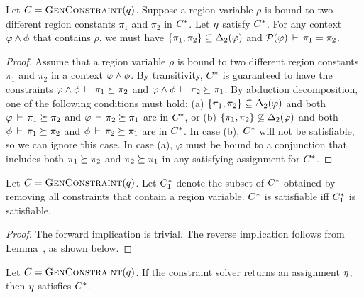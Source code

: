 \begin{lemma}
Let $C = \textsc{GenConstraint}(q)$.
Suppose a region variable $\rho$ is bound to two different region constants $\pi_1$
and $\pi_2$ in ${C}^*$.
Let $\eta$ satisfy ${C}^*$.
For any context $\varphi \wedge \phi$ that contains $\rho$, we must have
$\{ \pi_1, \pi_2 \} \subseteq {\Delta_2}(\varphi)$ and
$\mathcal{P}(\varphi)\,\vdash\,\pi_1 = \pi_2$.
\end{lemma}

\begin{proof}
  Assume that a region variable $\rho$ is bound to two different
  region constants $\pi_1$ and $\pi_2$ in a context $\varphi \wedge \phi$.
  By transitivity, ${C}^*$ is guaranteed to have the constraints
  $\varphi \wedge \phi\,\vdash\,\pi_1 \succeq \pi_2$
  and $\varphi \wedge \phi\,\vdash\,\pi_2 \succeq \pi_1$.
  By abduction decomposition, one of the following conditions must hold:
  (a) $\{ \pi_1, \pi_2 \} \subseteq {\Delta_2}(\varphi)$ and
  both $\varphi\,\vdash\,\pi_1 \succeq \pi_2$ and
  $\varphi\,\vdash\,\pi_2 \succeq \pi_1$ are in ${C}^*$, or
  (b) $\{ \pi_1, \pi_2 \} \not\subseteq {\Delta_2}(\varphi)$ and
  both $\phi\,\vdash\,\pi_1 \succeq \pi_2$ and
  $\phi\,\vdash\,\pi_2 \succeq \pi_1$ are in ${C}^*$.
  In case (b), ${C}^*$ will not be satisfiable, so we can ignore this case.
  In case (a), $\varphi$ must be bound to a conjunction that includes both
  $\pi_1 \succeq \pi_2$ and $\pi_2 \succeq \pi_1$ in any satisfying assignment
  for ${C}^*$.
\end{proof}

\begin{lemma}
Let $C = \textsc{GenConstraint}(q)$.
Let ${C}^*_1$ denote the subset of ${C}^*$ obtained by removing all constraints
that contain a region variable.
${C}^*$ is satisfiable iff ${C}^*_1$ is satisfiable.
\end{lemma}

\begin{proof}
  The forward implication is trivial.
  The reverse implication follows from Lemma~\label{lemma:completely-bound}, as shown below.


\end{proof}

\begin{theorem}
\label{thm:constraint-solver-soundness}
Let $C = \textsc{GenConstraint}(q)$.
If the constraint solver returns an assignment $\eta$,
then $\eta$ satisfies ${C}^*$.
\end{theorem}

